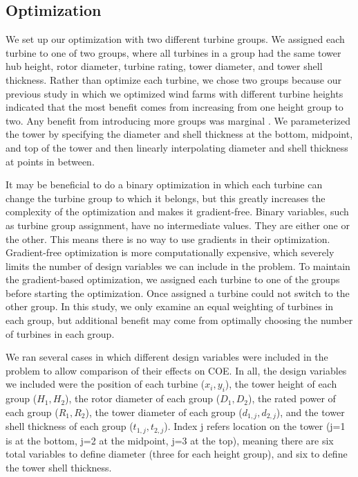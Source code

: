 \documentclass[wes, manuscript]{copernicus}
\providecommand{\DIFaddbegin}{} %
\providecommand{\DIFaddend}{} %
\begin{document}
	\subsection{Optimization}
	\DIFaddbegin \label{sec:optimization}
	\DIFaddend We set up our optimization with two different turbine groups. We assigned each turbine to one of two groups, where all turbines in a group had the same tower hub height, rotor diameter, turbine rating, tower diameter, and tower shell thickness.
Rather than optimize each turbine, we chose two groups because our previous study in which we optimized wind farms with different turbine heights indicated that the most benefit comes from increasing from one height group to two. Any benefit from introducing more groups was marginal \citep{stanley2018}. We parameterized the tower by specifying the diameter and shell thickness at the bottom, midpoint, and top of the tower and then linearly interpolating diameter and shell thickness at points in between. 

        It may be beneficial to do a binary optimization in which each turbine can change the turbine group to which it belongs, but this greatly increases the complexity of the optimization and makes it gradient-free. Binary variables, such as turbine group assignment, have no intermediate values. They are either one or the other. This means there is no way to use gradients in their optimization. Gradient-free optimization is more computationally expensive, which severely limits the number of design variables we can include in the problem. To maintain the gradient-based optimization, we assigned each turbine to one of the groups before starting the optimization. Once assigned a turbine could not switch to the other group. In this study, we only examine an equal weighting of turbines in each group, but additional benefit may come from optimally choosing the number of turbines in each group.%

        We ran several cases in which different design variables were included in the problem to allow comparison of their effects on COE. In all, the design variables we included were the position of each turbine ($x_i,y_i$), the tower height of each group ($H_1, H_2$), the rotor diameter of each group ($D_1, D_2$), the rated power of each group ($R_1, R_2$), the tower diameter of each group ($d_{1,j}, d_{2,j}$), and the tower shell thickness of each group ($t_{1,j}, t_{2,j}$). Index j refers location on the tower (j=1 is at the bottom, j=2 at the midpoint, j=3 at the top), meaning there are six total variables to define diameter (three for each height group), and six to define the tower shell thickness.
\end{document}

